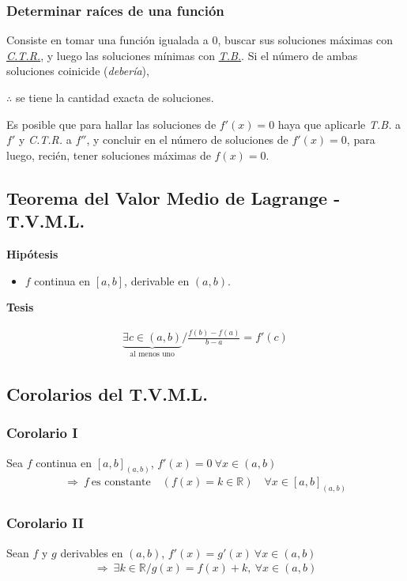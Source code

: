 \documentclass[11pt,titlepage]{article}
\newcommand{\littleTitle}[1]{
	\noindent \ignorespaces
	\small \textbf{#1} \normalsize
	\ignorespaces \ignorespacesafterend
}
\begin{document}
\subsubsection{Determinar raíces de una función}
Consiste en tomar una función igualada a $0$, buscar sus soluciones máximas con \hyperref[ctr]{\emph{C.T.R.}}, y luego 
las soluciones mínimas con \hyperref[uso_bolzano]{\emph{T.B.}}. Si el número de ambas soluciones coinicide (\emph{debería}), 
\begin{center}
	$\therefore$ se tiene la cantidad exacta de soluciones.
\end{center} \par
Es posible que para hallar las soluciones de $f'(x) = 0$ haya que aplicarle \emph{T.B.} a $f'$ y \emph{C.T.R.} 
a $f''$, y concluir en el número de soluciones de $f'(x) = 0$, para luego, recién, tener soluciones máximas de 
$f(x) = 0$.

\subsection{Teorema del Valor Medio de Lagrange - T.V.M.L.} \label{tvml}
\begin{commBoxy}
	\littleTitle{Hipótesis}
	\begin{itemize}
		\item $f$ continua en $[a,b]$, derivable en $(a,b)$.
	\end{itemize}

	\littleTitle{Tesis}
	\begin{gather*}
		\underbrace{\exists c \in (a,b)}_{\text{al menos uno}} / \frac{f(b) - f(a)}{b - a} = f'(c) 
	\end{gather*}
\end{commBoxy}

\subsection{Corolarios del T.V.M.L.}
\subsubsection{Corolario I}
Sea $f$ continua en ${[a,b]}_{(a,b)}$, $f'(x) = 0 \ \forall x \in (a,b)$
\begin{gather*}
	\Rightarrow \ f \ \text{es constante} \quad (f(x) = k \in \mathbb{R}) \quad \forall x \in {[a,b]}_{(a,b)}
\end{gather*}

\subsubsection{Corolario II}
Sean $f$ y $g$ derivables en $(a,b)$, $f'(x) = g'(x) \ \forall x \in (a,b)$
\begin{gather*}
	\Rightarrow \ \exists k \in \mathbb{R} / g(x) = f(x) + k, \ \forall x \in (a,b)
\end{gather*}
\end{document}
